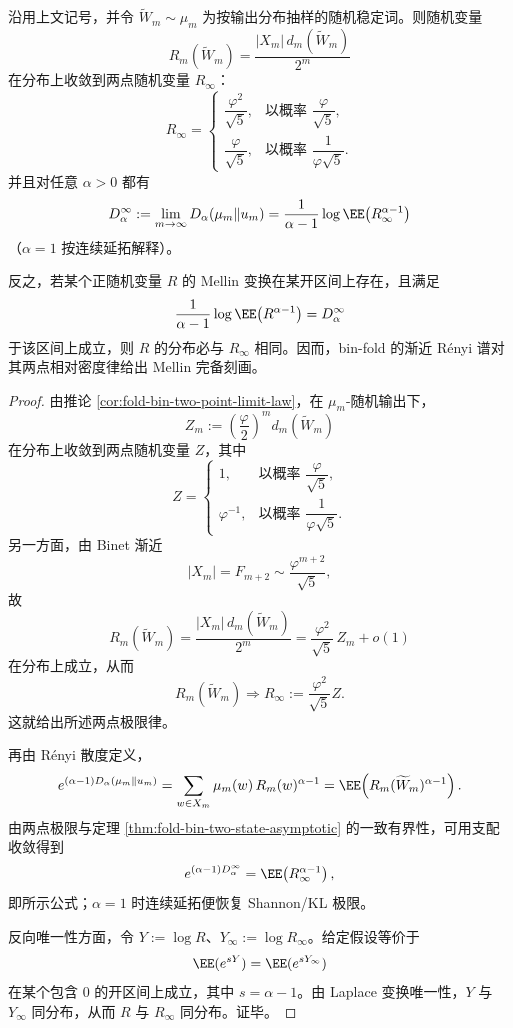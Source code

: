 \begin{theorem}\label{thm:conclusion-foldbin-renyi-mellin-complete-two-point-law}
沿用上文记号，并令 \(\widetilde W_m\sim \mu_m\) 为按输出分布抽样的随机稳定词。则随机变量
\[
R_m(\widetilde W_m)=\frac{|X_m|\,d_m(\widetilde W_m)}{2^m}
\]
在分布上收敛到两点随机变量 \(R_\infty\)：
\[
R_\infty=
\begin{cases}
\dfrac{\varphi^2}{\sqrt5}, & \text{以概率 }\dfrac{\varphi}{\sqrt5},\\[10pt]
\dfrac{\varphi}{\sqrt5}, & \text{以概率 }\dfrac{1}{\varphi\sqrt5}.
\end{cases}
\]
并且对任意 \(\alpha>0\) 都有
\[
D_\alpha^\infty
:=
\lim_{m\to\infty}D_\alpha(\mu_m\Vert u_m)
=
\frac{1}{\alpha-1}\log \EE\!\left(R_\infty^{\alpha-1}\right)
\]
（\(\alpha=1\) 按连续延拓解释）。

反之，若某个正随机变量 \(R\) 的 Mellin 变换在某开区间上存在，且满足
\[
\frac{1}{\alpha-1}\log \EE\!\left(R^{\alpha-1}\right)=D_\alpha^\infty
\]
于该区间上成立，则 \(R\) 的分布必与 \(R_\infty\) 相同。因而，bin-fold 的渐近 Rényi 谱对其两点相对密度律给出 Mellin 完备刻画。
\end{theorem}
\begin{proof}
由推论 \ref{cor:fold-bin-two-point-limit-law}，在 \(\mu_m\)-随机输出下，
\[
Z_m:=\left(\frac{\varphi}{2}\right)^m d_m(\widetilde W_m)
\]
在分布上收敛到两点随机变量 \(Z\)，其中
\[
Z=
\begin{cases}
1, & \text{以概率 }\dfrac{\varphi}{\sqrt5},\\[8pt]
\varphi^{-1}, & \text{以概率 }\dfrac{1}{\varphi\sqrt5}.
\end{cases}
\]
另一方面，由 Binet 渐近
\[
|X_m|=F_{m+2}\sim \frac{\varphi^{m+2}}{\sqrt5},
\]
故
\[
R_m(\widetilde W_m)
=
\frac{|X_m|\,d_m(\widetilde W_m)}{2^m}
=
\frac{\varphi^2}{\sqrt5}\,Z_m+o(1)
\]
在分布上成立，从而
\[
R_m(\widetilde W_m)\Rightarrow R_\infty:=\frac{\varphi^2}{\sqrt5}Z.
\]
这就给出所述两点极限律。

再由 Rényi 散度定义，
\[
e^{(\alpha-1)D_\alpha(\mu_m\Vert u_m)}
=
\sum_{w\in X_m}\mu_m(w)\,R_m(w)^{\alpha-1}
=
\EE\!\left(R_m(\widetilde W_m)^{\alpha-1}\right).
\]
由两点极限与定理 \ref{thm:fold-bin-two-state-asymptotic} 的一致有界性，可用支配收敛得到
\[
e^{(\alpha-1)D_\alpha^\infty}
=
\EE\!\left(R_\infty^{\alpha-1}\right),
\]
即所示公式；\(\alpha=1\) 时连续延拓便恢复 Shannon/KL 极限。

反向唯一性方面，令 \(Y:=\log R\)、\(Y_\infty:=\log R_\infty\)。给定假设等价于
\[
\EE(e^{sY})=\EE(e^{sY_\infty})
\]
在某个包含 \(0\) 的开区间上成立，其中 \(s=\alpha-1\)。由 Laplace 变换唯一性，\(Y\) 与 \(Y_\infty\) 同分布，从而 \(R\) 与 \(R_\infty\) 同分布。证毕。
\end{proof}

